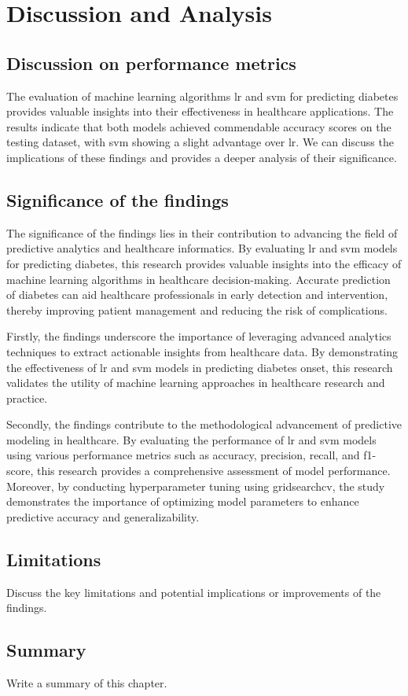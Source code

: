 \chapter{Discussion and Analysis}
\label{ch:evaluation}

\section{Discussion on performance metrics}%
The evaluation of machine learning algorithms lr and svm for predicting diabetes provides valuable insights into their effectiveness in healthcare applications. The results indicate that both models achieved commendable accuracy scores on the testing dataset, with svm showing a slight advantage over lr. We can discuss the implications of these findings and provides a deeper analysis of their significance.

\section{Significance of the findings}
The significance of the findings lies in their contribution to advancing the field of predictive analytics and healthcare informatics. By evaluating lr and svm models for predicting diabetes, this research provides valuable insights into the efficacy of machine learning algorithms in healthcare decision-making. Accurate prediction of diabetes can aid healthcare professionals in early detection and intervention, thereby improving patient management and reducing the risk of complications.

 Firstly, the findings underscore the importance of leveraging advanced analytics techniques to extract actionable insights from healthcare data. By demonstrating the effectiveness of lr and svm models in predicting diabetes onset, this research validates the utility of machine learning approaches in healthcare research and practice.

 Secondly, the findings contribute to the methodological advancement of predictive modeling in healthcare. By evaluating the performance of lr and svm models using various performance metrics such as accuracy, precision, recall, and f1-score, this research provides a comprehensive assessment of model performance. Moreover, by conducting hyperparameter tuning using gridsearchcv, the study demonstrates the importance of optimizing model parameters to enhance predictive accuracy and generalizability.

\section{Limitations} %
Discuss the key limitations and potential implications or improvements of the findings.
\section{Summary}
Write a summary of this chapter.